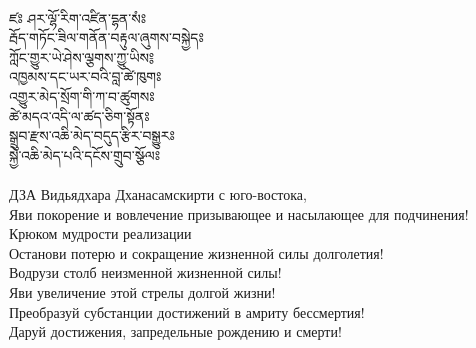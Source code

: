 \\
{\ti ཛཿ ཤར་ལྷོ་རིག་འཛིན་དྷན་སཾཿ \\
རྦོད་གཏོང་ཟིལ་གནོན་བརྟུལ་ཞུགས་བསྐྱེདཿ \\
ཀློང་གྱུར་ཡེ་ཤེས་ལྕགས་ཀྱུ་ཡིས༔ \\
འཁྱམས་དང་ཡར་བའི་བླ་ཚེ་ཁུགཿ \\
འགྱུར་མེད་སྲོག་གི་ཀ་བ་ཚུགསཿ \\
ཚེ་མདའ་འདི་ལ་ཚད་ཅིག་སྟོནཿ \\
སྒྲུབ་རྫས་འཆི་མེད་བདུད་རྩིར་བསྒྱུརཿ\\ 
སྐྱེ་འཆི་མེད་པའི་དངོས་གྲུབ་སྩོལཿ }\\
\\
ДЗА   Видьядхара Дханасамскирти с юго-востока,\\
Яви покорение и вовлечение призывающее и насылающее для подчинения!\\
Крюком мудрости реализации\\
Останови потерю и сокращение жизненной силы долголетия!\\
Водрузи столб неизменной жизненной силы!\\
Яви увеличение этой стрелы долгой жизни!\\
Преобразуй субстанции достижений в амриту бессмертия!\\
Даруй достижения, запредельные рождению и смерти!\\
\\


